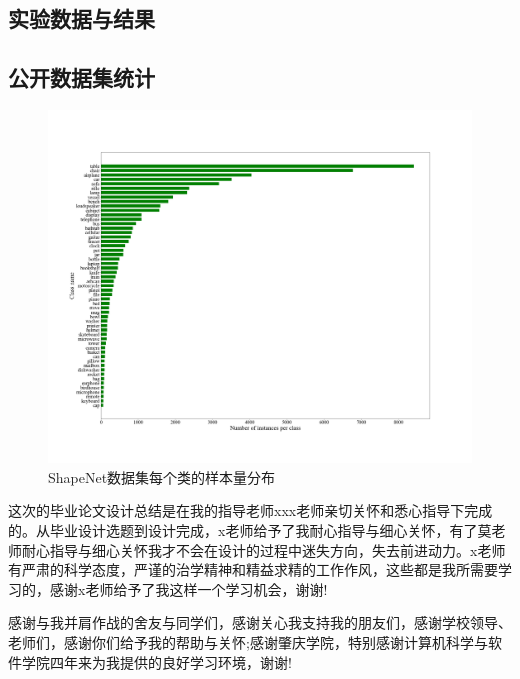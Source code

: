 \documentclass[bachelor, nocolorlinks, printoneside]{seuthesis} %
\begin{document}
\begin{Appendix}{}
    \chapter{实验数据与结果}
    \section{公开数据集统计}
    \begin{figure}
        \centering
        \includegraphics[width=0.99\columnwidth]{figs/data_stats.png}
        \caption{ShapeNet数据集每个类的样本量分布}
        \label{fig:data-stats}
    \end{figure}
    
\end{Appendix}

\begin{Acknowledgement}{}
    这次的毕业论文设计总结是在我的指导老师xxx老师亲切关怀和悉心指导下完成的。从毕业设计选题到设计完成，x老师给予了我耐心指导与细心关怀，有了莫老师耐心指导与细心关怀我才不会在设计的过程中迷失方向，失去前进动力。x老师有严肃的科学态度，严谨的治学精神和精益求精的工作作风，这些都是我所需要学习的，感谢x老师给予了我这样一个学习机会，谢谢!

    感谢与我并肩作战的舍友与同学们，感谢关心我支持我的朋友们，感谢学校领导、老师们，感谢你们给予我的帮助与关怀;感谢肇庆学院，特别感谢计算机科学与软件学院四年来为我提供的良好学习环境，谢谢!
\end{Acknowledgement}

\newpage
\printindex %



%
%
\end{document}

